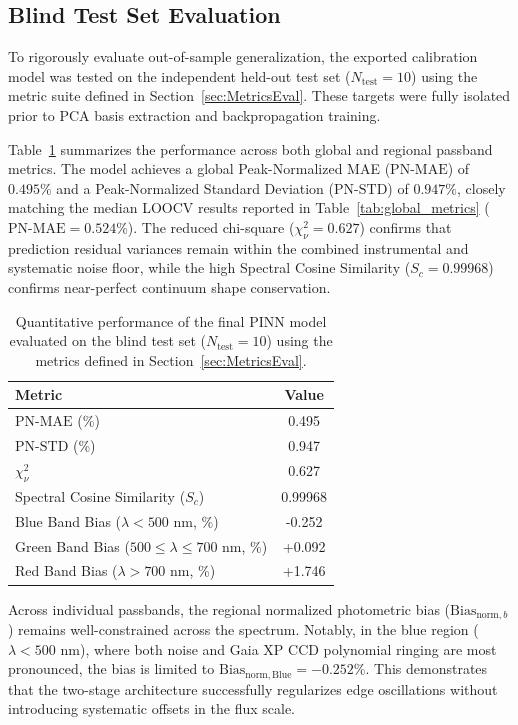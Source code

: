 \documentclass{aa}
\begin{document}
\subsection{Blind Test Set Evaluation} \label{sec:blind_test}

To rigorously evaluate out-of-sample generalization, the exported calibration model was tested on the independent held-out test set ($N_{\text{test}} = 10$) using the metric suite defined in Section~\ref{sec:MetricsEval}. These targets were fully isolated prior to PCA basis extraction and backpropagation training.

Table~\ref{tab:test_set_metrics} summarizes the performance across both global and regional passband metrics. The model achieves a global Peak-Normalized MAE ($\mathrm{PN\text{-}MAE}$) of $0.495\%$ and a Peak-Normalized Standard Deviation ($\mathrm{PN\text{-}STD}$) of $0.947\%$, closely matching the median LOOCV results reported in Table~\ref{tab:global_metrics} ($\mathrm{PN\text{-}MAE} = 0.524\%$). The reduced chi-square ($\chi^2_\nu = 0.627$) confirms that prediction residual variances remain within the combined instrumental and systematic noise floor, while the high Spectral Cosine Similarity ($S_c = 0.99968$) confirms near-perfect continuum shape conservation.

\begin{table}[ht!]
\caption{Quantitative performance of the final PINN model evaluated on the blind test set ($N_{\text{test}} = 10$) using the metrics defined in Section~\ref{sec:MetricsEval}.}
\label{tab:test_set_metrics}
\centering
\begin{tabular}{lc}
\hline\hline
Metric & Value \\
\hline
$\mathrm{PN\text{-}MAE}$ (\%) & 0.495 \\
$\mathrm{PN\text{-}STD}$ (\%) & 0.947 \\
$\chi^2_\nu$ & 0.627 \\
Spectral Cosine Similarity ($S_c$) & 0.99968 \\
Blue Band Bias ($\lambda < 500\text{ nm}$, \%) & -0.252 \\
Green Band Bias ($500 \le \lambda \le 700\text{ nm}$, \%) & +0.092 \\
Red Band Bias ($\lambda > 700\text{ nm}$, \%) & +1.746 \\
\hline
\end{tabular}
\end{table}

Across individual passbands, the regional normalized photometric bias ($\mathrm{Bias}_{\mathrm{norm}, b}$) remains well-constrained across the spectrum. Notably, in the blue region ($\lambda < 500\text{ nm}$), where both noise and Gaia XP CCD polynomial ringing are most pronounced, the bias is limited to $\mathrm{Bias}_{\mathrm{norm, Blue}} = -0.252\%$. This demonstrates that the two-stage architecture successfully regularizes edge oscillations without introducing systematic offsets in the flux scale.
\end{document}
